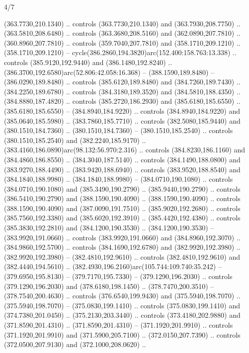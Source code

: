 \begin{flagdescription}{4/7}
\begin{scope}[shift={(0.5\flaglength,0.5\flagwidth)},scale=\flagwidth*\stretchfactor/820]
\begin{scope}[scale=1.87,xshift=-138mm,yshift=75mm]
\begin{scope}[y=0.8pt, x=0.8pt, yscale=-1, xscale=1]
\begin{scope}[cm={{1.16833,0.0,0.0,1.16833,(-0.699,1.184)}},fill=c78732e]
  (363.7730,210.1340) .. controls (363.7730,210.1340) and (363.7930,208.7750) ..
  (363.5810,208.6480) .. controls (363.3680,208.5160) and (362.0890,207.7810) ..
  (360.8960,207.7810) .. controls (359.7040,207.7810) and (358.1710,209.1210) ..
  (358.1710,209.1210) -- cycle(386.2860,194.3820)arc(152.400:158.763:13.338) ..
  controls (385.9120,192.9440) and (386.1480,192.8240) ..
  (386.3700,192.6580)arc(52.806:42.058:16.368) -- (388.1590,189.8480) --
  (386.0290,189.8480) .. controls (385.6120,189.8480) and (384.7260,189.7430) ..
  (384.2250,189.6780) .. controls (384.3180,189.3520) and (384.5810,188.4350) ..
  (384.8880,187.4820) .. controls (385.2720,186.2930) and (385.6180,185.6550) ..
  (385.6180,185.6550) -- (384.8940,184.9220) .. controls (384.8940,184.9220) and
  (385.0640,185.5980) .. (383.7860,185.7710) .. controls (382.5080,185.9440) and
  (380.1510,184.7360) .. (380.1510,184.7360) -- (380.1510,185.2540) .. controls
  (380.1510,185.2540) and (382.2240,185.9170) ..
  (383.4160,186.0890)arc(98.132:56.970:2.316) .. controls (384.8230,186.1160)
  and (384.4860,186.8550) .. (384.3040,187.5140) .. controls (384.1490,188.0800)
  and (383.9270,188.4490) .. (383.9420,188.6940) .. controls (383.9520,188.8540)
  and (384.1840,188.9980) .. (384.1840,188.9980) -- (384.0710,190.1080) ..
  controls (384.0710,190.1080) and (385.3490,190.2790) .. (385.9440,190.2790) ..
  controls (386.5410,190.2790) and (388.1590,190.4090) .. (388.1590,190.4090) ..
  controls (388.1590,190.4090) and (387.0090,191.7510) .. (385.9020,192.2680) ..
  controls (385.7560,192.3380) and (385.6020,192.3910) .. (385.4420,192.4380) ..
  controls (385.3830,192.2810) and (384.1200,190.3530) .. (384.1200,190.3530) --
  (383.9920,191.0660) .. controls (383.9920,191.0660) and (384.8960,192.3070) ..
  (384.9860,192.5700) .. controls (384.1690,192.6780) and (382.9920,192.3980) ..
  (382.9920,192.3980) -- (382.4810,192.9610) .. controls (382.4810,192.9610) and
  (382.4440,194.5610) .. (382.4930,196.2160)arc(105.744:109.740:35.242) --
  (379.6950,195.8130) -- (379.7170,195.7330) -- (379.1290,196.2030) .. controls
  (379.1290,196.2030) and (378.6180,198.1450) .. (378.7470,200.3510) --
  (378.7540,200.4630) .. controls (376.6540,199.9430) and (375.5940,198.7070) ..
  (375.5940,198.7070) -- (375.0830,199.1410) .. controls (375.0830,199.1410) and
  (374.7380,201.0450) .. (375.2130,203.3440) .. controls (373.4180,202.9880) and
  (371.8590,201.4310) .. (371.8590,201.4310) -- (371.1920,201.9910) .. controls
  (371.1920,201.9910) and (371.5900,205.7100) .. (372.0150,207.7390) .. controls
  (372.0500,207.9130) and (372.1000,208.0620) ..

\end{scope}
\end{scope}
\end{scope}
\end{scope}
\end{flagdescription}
